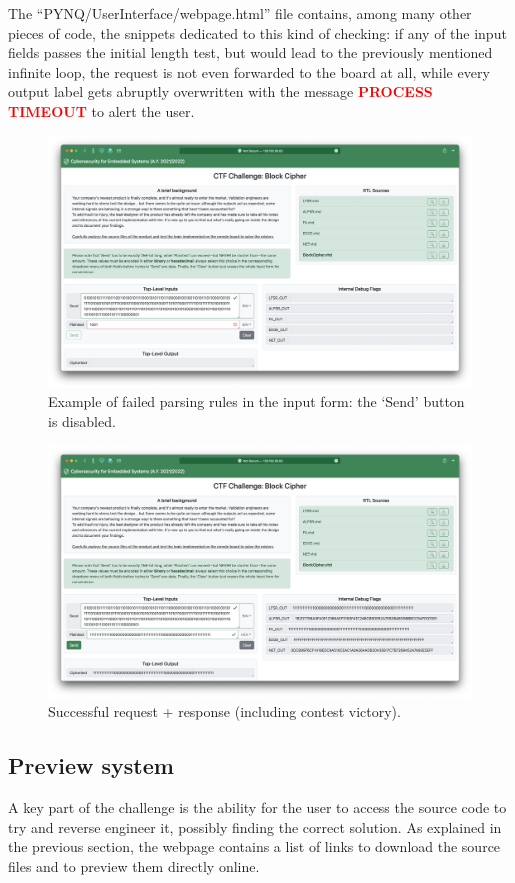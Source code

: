 The ``PYNQ/UserInterface/webpage.html'' file contains, among many other pieces of code, the snippets dedicated to this kind of checking:
if any of the input fields passes the initial length test, but would lead to the previously mentioned infinite loop, the request is not even forwarded to the board at all, while every output label gets abruptly overwritten with the message \textcolor{red}{\textbf{PROCESS TIMEOUT}} to alert the user.
\begin{figure}[!ht]
\vspace{0.5cm}
\includegraphics[width=\textwidth]{images/parsing.png}
\caption{Example of failed parsing rules in the input form: the `Send' button is disabled.}
\end{figure}
\begin{figure}[!ht]
\vspace{0.5cm}
\includegraphics[width=\textwidth]{images/success.png}
\caption{Successful request + response (including contest victory).}
\end{figure}
\subsection{Preview system}
A key part of the challenge is the ability for the user to access the source code to try and reverse engineer it, possibly finding the correct solution.
As explained in the previous section, the webpage contains a list of links to download the source files and to preview them directly online.

